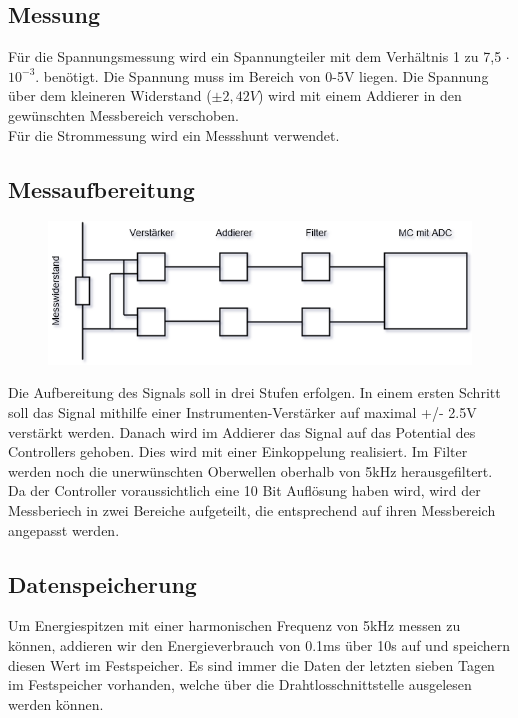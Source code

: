 \documentclass[12pt,a4paper]{article}
\begin{document}
\subsection{Messung}
Für die Spannungsmessung wird ein Spannungteiler mit dem Verhältnis 1 zu 7,5 $\cdot$ $10^{-3}$. benötigt. Die Spannung muss im Bereich von 0-5V liegen. Die Spannung über dem kleineren Widerstand ($\pm 2,42V$) wird mit einem Addierer in den gewünschten Messbereich verschoben.\\
Für die Strommessung wird ein Messshunt verwendet.
\subsection{Messaufbereitung}
\begin{figure}[htbp] 
  \centering
\includegraphics[scale=0.9]{Block-Messung.png}
  \caption{}
  \label{fig:Bild1}
\end{figure}

Die Aufbereitung des Signals soll in drei Stufen erfolgen. In einem ersten Schritt soll das Signal mithilfe einer Instrumenten-Verstärker auf maximal +/- 2.5V verstärkt werden. Danach wird im Addierer das Signal auf das Potential des Controllers gehoben. Dies wird mit einer Einkoppelung realisiert. Im Filter werden noch die unerwünschten Oberwellen oberhalb von 5kHz herausgefiltert. Da der Controller voraussichtlich eine 10 Bit Auflösung haben wird, wird der Messberiech in zwei Bereiche aufgeteilt, die entsprechend auf ihren Messbereich angepasst werden.
\subsection{Datenspeicherung}
Um Energiespitzen mit einer harmonischen Frequenz von 5kHz messen zu können, addieren wir den Energieverbrauch von 0.1ms über 10s auf und speichern diesen Wert im Festspeicher. Es sind immer die Daten der letzten sieben Tagen im Festspeicher vorhanden, welche über die Drahtlosschnittstelle ausgelesen werden können.
\end{document}
